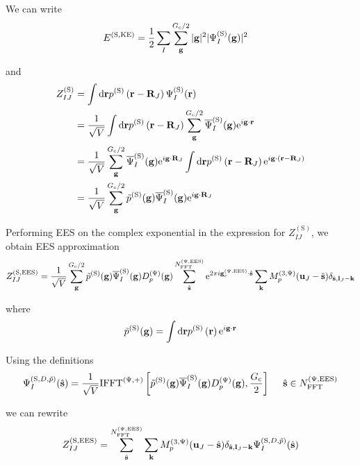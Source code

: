 \documentclass[paper=a4, fontsize=11pt]{article} %
\numberwithin{equation}{section} %
\numberwithin{figure}{section} %
\numberwithin{table}{section} %
\newcommand{\bu}{{\bf{u}}}
\newcommand{\bl}{{\bf{l}}}
\newcommand{\bk}{{\bf{k}}}
\newcommand{\bs}{{\bf{s}}}
\newcommand{\bg}{{\bf{g}}}
\newcommand{\br}{{\bf{r}}}
\newcommand{\bR}{{\bf{R}}}
\newcommand{\hs}{{\hat{\bf{s}}}}
\newcommand{\rS}{{\mathrm{S}}}
\newcommand{\rKE}{{\mathrm{KE}}}
\newcommand{\rEES}{{\mathrm{EES}}}
\newcommand{\re}{{\mathrm{e}}}
\newcommand{\rd}{{\mathrm{d}}}
\newcommand{\ibgR}{i\bg\cdot\bR}
\newcommand{\ibgr}{i\bg\cdot\br}
\newcommand{\gcpEES}{{\bg_c^{(\Psi,\rEES)}}}
\newcommand{\igcps}{2\pi i\gcpEES\cdot\hat \bs}
\newcommand{\psigs}{{\overline \Psi_I^{(\rS)}(\bg)}}
\newcommand{\NFFTpEES}{{N^{\mathrm{(\Psi,\rEES})}_{\mathrm{FFT}}}}
\newcommand{\Gc}{{G_{\mathrm{c}}}}
\newcommand{\hGc}{{\frac{G_{\mathrm{c}}}{2}}}
\newcommand{\Dpg}{{D^{(\Psi)}_p(\bg)}}
\newcommand{\Mp}{{M_p^{(3,\Psi)}}}
\newcommand{\IFFTp}{{\mathrm{IFFT}^{(\Psi,+)}}}
\newcommand{\hsinpEES}{{\ \ \ \ \hs \in \NFFTpEES}}
\begin{document}
We can write
\begin{equation}
\begin{split}
E^{(\rS,\rKE)}
&= \frac{1}{2}\sum_I \sum_\bg^{\Gc/2} |\bg|^2 |\Psi_I^{(\rS)}(\bg)|^2
\end{split}
\end{equation}


and
\begin{equation}
\begin{split}
Z_{IJ}^{(\rS)}
& = \int \rd\br  p^{(\rS)}\left( \br-\bR_J \right)\Psi_I^{(\rS)}(\br) \\
& = \frac{1}{\sqrt{V}}\int \rd\br  p^{(\rS)}\left( \br-\bR_J \right) \sum_\bg^{\Gc/2} \psigs \re^{\ibgr} \\
& = \frac{1}{\sqrt{V}}\sum_\bg^{\Gc/2} \psigs \re^{\ibgR_J}\int \rd\br  p^{(\rS)}\left( \br-\bR_J \right)\re^{ i \bg\cdot(\br-\bR_J)} \\
& = \frac{1}{\sqrt{V}}\sum_\bg^{\Gc/2} \tilde p^{(\rS)} (\bg)\psigs \re^{\ibgR_J}\\
\end{split}
\end{equation}

Performing EES on the complex exponential in the expression for $Z_{IJ}^{(\rS)}$, we obtain EES approximation
\begin{equation}\label{eq:ZSEES}
Z_{IJ}^{(\rS,\rEES)}= \frac{1}{\sqrt{V}}\sum_{\bg}^{\Gc/2} \tilde p^{(\rS)} (\bg)\psigs \Dpg \sum_{\hat \bs}^{\NFFTpEES} \re^{\igcps} \sum_{\bk}\Mp(\bu_{J}-\hat \bs)\delta_{\hat \bs,\bl_J-\bk}
\end{equation}

where 
\begin{equation}\label{eq:psgdef}
\tilde p^{(\rS)} (\bg) = \int \rd\br  p^{(\rS)}\left( \br\right)\re^{ i \bg\cdot \br}
\end{equation}


Using the definitions
\begin{equation}
\begin{split}
\Psi_I^{(\rS,D,\tilde p)}(\hs)
&= \frac{1}{\sqrt{V}}\IFFTp \left[ \tilde p^{(\rS)}(\bg)\psigs \Dpg,\hGc\right]\hsinpEES \\
\end{split}
\end{equation}

we can rewrite
\begin{equation}
\begin{split}
Z_{IJ}^{(\rS,\rEES)}& = \sum_{\hat \bs}^{\NFFTpEES}  \sum_{\bk} \Mp(\bu_{J}-\hat \bs)\delta_{\hat \bs,\bl_J-\bk} \Psi_I^{(\rS,D,\tilde p)}(\hs)\\
\end{split}
\end{equation}
\end{document}
